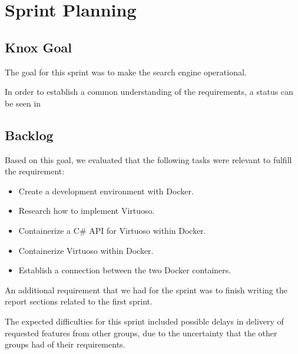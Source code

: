\section{Sprint Planning}
\subsection*{Knox Goal}
The goal for this sprint was to make the search engine operational.

In order to establish a common understanding of the requirements, a status can be seen in %


\subsection*{Backlog}
Based on this goal, we evaluated that the following tasks were relevant to fulfill the requirement:
\begin{itemize}
    \item Create a development environment with Docker.
    \item Research how to implement Virtuoso.
    \item Containerize a C\# API for Virtuoso within Docker.
    \item Containerize Virtuoso within Docker.
    \item Establish a connection between the two Docker containers.
\end{itemize}

An additional requirement that we had for the sprint was to finish writing the report sections related to the first \knox{} sprint.

The expected difficulties for this sprint included possible delays in delivery of requested features from other groups, due to the uncertainty that the other groups had of their requirements. 




